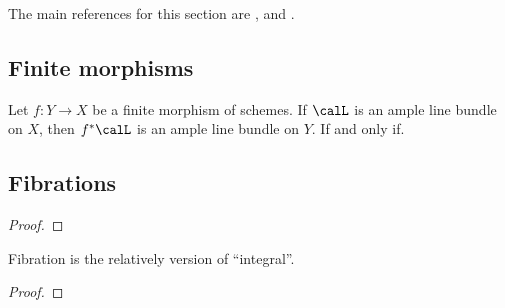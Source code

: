 The main references for this section are \cite{Har77}, \cite{Laz04a} and \cite{FOV99:joinsAndIntersections}.



\subsection{Finite morphisms}

    \begin{theorem}\label{thm:finite_preserve_ampleness}
        Let \(f: Y \to X\) be a finite morphism of schemes. 
        If \(\calL\) is an ample line bundle on \(X\), then \(f^*\calL\) is an ample line bundle on \(Y\).
        If and only if.
    \end{theorem}

\subsection{Fibrations}


    \begin{proof}

        \Yang{}
    \end{proof}

    \begin{slogan}
        Fibration is the relatively version of ``integral''.
    \end{slogan}

    \begin{proof}
        \Yang{}
    \end{proof}


